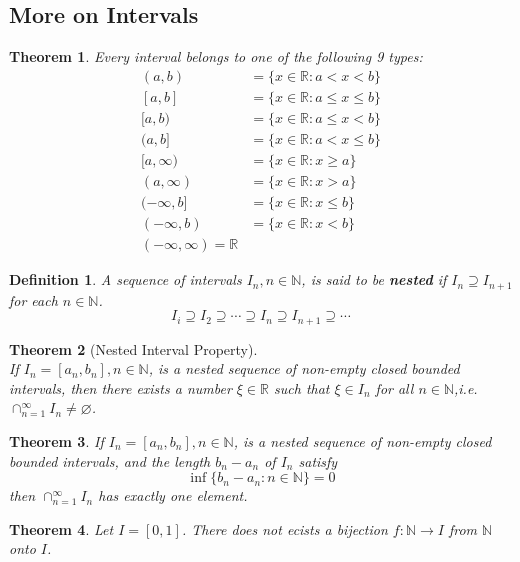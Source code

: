 \documentclass[12pt]{article}
\newtheorem{definition}{Definition}[section]
\newtheorem{theorem}{Theorem}[section]
\theoremstyle{definition}
\begin{document}
\subsection{More on Intervals}
\begin{theorem}\normalfont Every interval belongs to one of the following 9 types:
\[
\begin{aligned}
(a,b)&=\{x\in\mathbb{R}:a<x<b\}\\
[a,b]&=\{x\in\mathbb{R}:a\leq x\leq b\}\\
[a,b)&=\{x\in\mathbb{R}:a\leq x<b\}\\
(a,b]&=\{x\in\mathbb{R}:a<x\leq b\}\\
[a,\infty)&=\{x\in\mathbb{R}:x\geq a\}\\
(a,\infty)&=\{x\in\mathbb{R}:x>a\}\\
(-\infty,b]&=\{x\in\mathbb{R}:x\leq b\}\\
(-\infty,b)&=\{x\in\mathbb{R}:x<b\}\\
(-\infty,\infty)=\mathbb{R}
\end{aligned}
\]
\end{theorem}
\begin{definition}\normalfont A sequence of intervals $I_n, n\in\mathbb{N}$, is said to be \textbf{nested} if $I_n\supseteq I_{n+1}$ for each $n\in\mathbb{N}$.
\[
I_i\supseteq I_2\supseteq \cdots \supseteq I_n\supseteq I_{n+1}\supseteq \cdots
\]
\end{definition}
\begin{theorem}[Nested Interval Property]
\hfill\\\normalfont If $I_n=[a_n,b_n], n\in\mathbb{N}$, is a nested sequence of non-empty closed bounded intervals, then there exists a number $\xi\in\mathbb{R}$ such that $\xi\in I_n$ for all $n\in\mathbb{N}$,i.e. $\cap_{n=1}^\infty I_n\neq\varnothing$.
\end{theorem}
\begin{theorem}\normalfont If $I_n=[a_n,b_n],n\in\mathbb{N}$, is a nested sequence of non-empty closed bounded intervals, and the length $b_n-a_n$ of $I_n$ satisfy
\[
\inf\{b_n-a_n:n\in\mathbb{N}\}=0
\]
then $\cap_{n=1}^\infty I_n$ has exactly one element.
\end{theorem}
\begin{theorem}\normalfont Let $I=[0,1]$. There does not ecists a bijection $f:\mathbb{N}\to I$ from $\mathbb{N}$ onto $I$.
\end{theorem}
\clearpage
\end{document}
